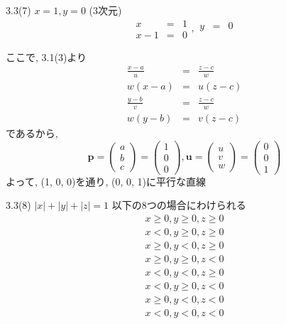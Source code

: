 \documentclass{beamer}
\begin{document}
\begin{frame}{3.3(7) $x = 1, y=0$ (3次元)}
  \begin{equation*}
    \begin{array}{ccc}
      x &=& 1\\
      x-1 &=& 0
    \end{array},
    \begin{array}{ccc}
      y &=& 0\\
      &&
    \end{array}
  \end{equation*}

  ここで, 3.1(3)より
  \begin{eqnarray*}
    \frac{x-a}{u} &=& \frac{z-c}{w} \\
    w(x-a) &=& u(z-c) \\
    \frac{y-b}{v} &=& \frac{z-c}{w} \\
    w(y-b) &=& v(z-c)
  \end{eqnarray*}
  であるから, 
  \begin{equation*}
    \bm{p} = 
    \begin{pmatrix}
      a\\
      b\\
      c
    \end{pmatrix} =
    \begin{pmatrix}
      1\\
      0\\
      0
    \end{pmatrix} , 
    \bm{u} =
    \begin{pmatrix}
      u\\
      v\\
      w
    \end{pmatrix} = 
    \begin{pmatrix}
      0\\
      0\\
      1
    \end{pmatrix}
  \end{equation*}
  よって, (1, 0, 0)を通り, (0, 0, 1)に平行な直線
\end{frame}



\begin{frame}{3.3(8) $|x| + |y| + |z|  = 1$}
  以下の8つの場合にわけられる
  \begin{eqnarray*}
    x \geq 0, y \geq 0, z \geq 0 \\
    x < 0, y \geq 0, z \geq 0 \\
    x \geq 0, y < 0, z \geq 0 \\
    x \geq 0, y \geq 0, z < 0 \\
    x < 0, y < 0, z \geq 0 \\
    x < 0, y \geq 0, z < 0 \\
    x \geq 0, y < 0, z < 0 \\
    x < 0, y < 0, z < 0 
  \end{eqnarray*}
\end{frame}
\end{document}
